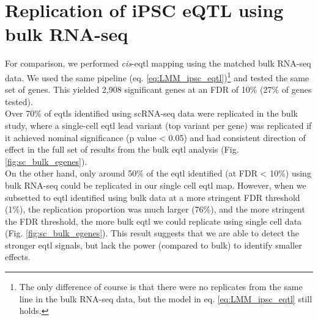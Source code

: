 \newpage

\section{Replication of iPSC eQTL using bulk RNA-seq}

For comparison, we performed \textit{cis}-\gls{eqtl} mapping using the matched bulk RNA-seq data.
We used the same pipeline (eq. \eqref{eq:LMM_ipsc_eqtl})\footnote{The only difference of course is that there were no replicates from the same line in the bulk RNA-seq data, but the model in eq. \eqref{eq:LMM_ipsc_eqtl} still holds.} 
and tested the same set of genes. 
This yielded 2,908 significant genes at an FDR of 10\%
(27\% of genes tested). \\

Over 70\% of \glspl{eqtl} identified using scRNA-seq data were replicated in the bulk study, where a single-cell \gls{eqtl} lead variant (top variant per gene) was replicated if it achieved nominal significance (p value < 0.05) and had consistent direction of effect in the full set of results from the bulk \gls{eqtl} analysis (Fig. \ref{fig:sc_bulk_egenes}). \\

On the other hand, only around 50\% of the \gls{eqtl} identified (at FDR < 10\%) using bulk RNA-seq could be replicated
in our single cell \gls{eqtl} map.
However, when we subsetted to \gls{eqtl} identified using bulk data at a more stringent FDR threshold (1\%), the replication proportion was much larger (76\%), and the more stringent the FDR threshold, the more bulk \gls{eqtl} we could replicate using single cell data (Fig. \ref{fig:sc_bulk_egenes}).
This result suggests that we are able to detect the stronger \gls{eqtl} signals, but lack the power (compared to bulk) to identify smaller effects.

